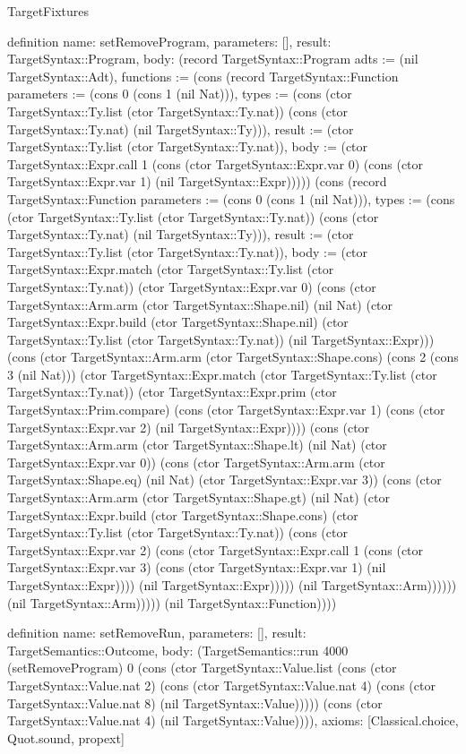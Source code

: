 \begin{lexlean}{TargetFixtures}
\begin{semanticmodule}
definition{
  name: setRemoveProgram,
  parameters: [],
  result: TargetSyntax::Program,
  body: (record TargetSyntax::Program {adts := (nil TargetSyntax::Adt), functions := (cons (record TargetSyntax::Function {parameters := (cons 0 (cons 1 (nil Nat))), types := (cons (ctor TargetSyntax::Ty.list (ctor TargetSyntax::Ty.nat)) (cons (ctor TargetSyntax::Ty.nat) (nil TargetSyntax::Ty))), result := (ctor TargetSyntax::Ty.list (ctor TargetSyntax::Ty.nat)), body := (ctor TargetSyntax::Expr.call 1 (cons (ctor TargetSyntax::Expr.var 0) (cons (ctor TargetSyntax::Expr.var 1) (nil TargetSyntax::Expr))))}) (cons (record TargetSyntax::Function {parameters := (cons 0 (cons 1 (nil Nat))), types := (cons (ctor TargetSyntax::Ty.list (ctor TargetSyntax::Ty.nat)) (cons (ctor TargetSyntax::Ty.nat) (nil TargetSyntax::Ty))), result := (ctor TargetSyntax::Ty.list (ctor TargetSyntax::Ty.nat)), body := (ctor TargetSyntax::Expr.match (ctor TargetSyntax::Ty.list (ctor TargetSyntax::Ty.nat)) (ctor TargetSyntax::Expr.var 0) (cons (ctor TargetSyntax::Arm.arm (ctor TargetSyntax::Shape.nil) (nil Nat) (ctor TargetSyntax::Expr.build (ctor TargetSyntax::Shape.nil) (ctor TargetSyntax::Ty.list (ctor TargetSyntax::Ty.nat)) (nil TargetSyntax::Expr))) (cons (ctor TargetSyntax::Arm.arm (ctor TargetSyntax::Shape.cons) (cons 2 (cons 3 (nil Nat))) (ctor TargetSyntax::Expr.match (ctor TargetSyntax::Ty.list (ctor TargetSyntax::Ty.nat)) (ctor TargetSyntax::Expr.prim (ctor TargetSyntax::Prim.compare) (cons (ctor TargetSyntax::Expr.var 1) (cons (ctor TargetSyntax::Expr.var 2) (nil TargetSyntax::Expr)))) (cons (ctor TargetSyntax::Arm.arm (ctor TargetSyntax::Shape.lt) (nil Nat) (ctor TargetSyntax::Expr.var 0)) (cons (ctor TargetSyntax::Arm.arm (ctor TargetSyntax::Shape.eq) (nil Nat) (ctor TargetSyntax::Expr.var 3)) (cons (ctor TargetSyntax::Arm.arm (ctor TargetSyntax::Shape.gt) (nil Nat) (ctor TargetSyntax::Expr.build (ctor TargetSyntax::Shape.cons) (ctor TargetSyntax::Ty.list (ctor TargetSyntax::Ty.nat)) (cons (ctor TargetSyntax::Expr.var 2) (cons (ctor TargetSyntax::Expr.call 1 (cons (ctor TargetSyntax::Expr.var 3) (cons (ctor TargetSyntax::Expr.var 1) (nil TargetSyntax::Expr)))) (nil TargetSyntax::Expr))))) (nil TargetSyntax::Arm)))))) (nil TargetSyntax::Arm))))}) (nil TargetSyntax::Function)))})
}

definition{
  name: setRemoveRun,
  parameters: [],
  result: TargetSemantics::Outcome,
  body: (TargetSemantics::run 4000 (setRemoveProgram) 0 (cons (ctor TargetSyntax::Value.list (cons (ctor TargetSyntax::Value.nat 2) (cons (ctor TargetSyntax::Value.nat 4) (cons (ctor TargetSyntax::Value.nat 8) (nil TargetSyntax::Value))))) (cons (ctor TargetSyntax::Value.nat 4) (nil TargetSyntax::Value)))),
  axioms: [Classical.choice, Quot.sound, propext]
}


\end{semanticmodule}
\end{lexlean}
